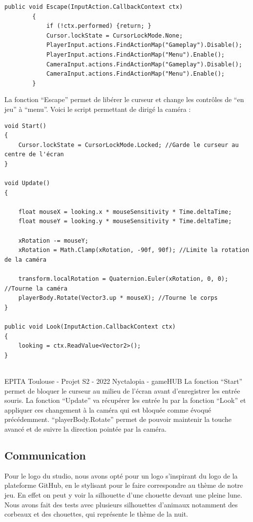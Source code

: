 \begin{lstlisting}[language={[Sharp]C}, caption={Fonction C\# Escape}, label={Script}]
public void Escape(InputAction.CallbackContext ctx)
		{
			if (!ctx.performed) {return; }
			Cursor.lockState = CursorLockMode.None;
			PlayerInput.actions.FindActionMap("Gameplay").Disable();
			PlayerInput.actions.FindActionMap("Menu").Enable();
			CameraInput.actions.FindActionMap("Gameplay").Disable();
			CameraInput.actions.FindActionMap("Menu").Enable();
		}
\end{lstlisting}
La fonction ``Escape'' permet de libérer le curseur et change les contrôles de ``en jeu'' à ``menu''.
Voici le script permettant de dirigé la caméra :
\newline

\begin{lstlisting}[language={[Sharp]C}, caption={Fonction C\# Caméra}, label={Script}]
void Start()
{
    Cursor.lockState = CursorLockMode.Locked; //Garde le curseur au centre de l'écran
}
    
void Update()
{
        
    float mouseX = looking.x * mouseSensitivity * Time.deltaTime;
    float mouseY = looking.y * mouseSensitivity * Time.deltaTime;

    xRotation -= mouseY;
    xRotation = Math.Clamp(xRotation, -90f, 90f); //Limite la rotation de la caméra
        
    transform.localRotation = Quaternion.Euler(xRotation, 0, 0); //Tourne la caméra
    playerBody.Rotate(Vector3.up * mouseX); //Tourne le corps
}

public void Look(InputAction.CallbackContext ctx)
{
	looking = ctx.ReadValue<Vector2>();
}
\end{lstlisting}
\vfill
\noindent\makebox[\linewidth]{\rule{.8\paperwidth}{.6pt}}\\[0.2cm]
EPITA Toulouse - Projet S2 - 2022 \hfill Nyctalopia - gameHUB
\noindent\makebox[\linewidth]{\rule{.8\paperwidth}{.6pt}}
\newpage
La fonction ``Start'' permet de bloquer le curseur au milieu de l'écran avant d'enregistrer les entrée souris.
La fonction ``Update'' va récupérer les entrée lu par la fonction ``Look'' et appliquer ces changement à la caméra qui est bloquée comme évoqué précédemment.
``playerBody.Rotate'' permet de pouvoir maintenir la touche avancé et de suivre la direction pointée par la caméra.

\subsection{Communication}
\setlength{\parindent}{5ex}
Pour le logo du studio, nous avons opté pour un logo s’inspirant du logo de la plateforme GitHub, en le stylisant pour le faire correspondre au thème de notre jeu. En effet on peut y voir la silhouette d’une chouette devant une pleine lune. Nous avons fait des tests avec plusieurs silhouettes d’animaux notamment des corbeaux et des chouettes, qui représente le thème de la nuit.

